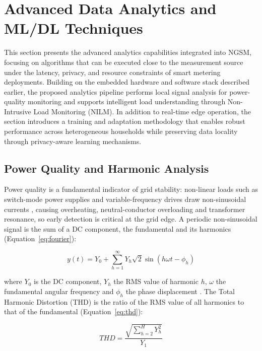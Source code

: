 \documentclass[fleqn,10pt]{wlscirep}
\begin{document}
\section{Advanced Data Analytics and ML/DL Techniques}
\label{sec:ai}

This section presents the advanced analytics capabilities integrated into NGSM, focusing on algorithms that can be executed close to the measurement source under the latency, privacy, and resource constraints of smart metering deployments. Building on the embedded hardware and software stack described earlier, the proposed analytics pipeline performs local signal analysis for power-quality monitoring and supports intelligent load understanding through Non-Intrusive Load Monitoring (NILM). In addition to real-time edge operation, the section introduces a training and adaptation methodology that enables robust performance across heterogeneous households while preserving data locality through privacy-aware learning mechanisms.


\subsection{Power Quality and Harmonic Analysis}
\label{subsec:harmonics}

Power quality is a fundamental indicator of grid stability: non-linear loads such as switch-mode power supplies and variable-frequency drives draw non-sinusoidal currents \cite{dugan2012electrical}, causing overheating, neutral-conductor overloading and transformer resonance, so early detection \cite{eristi2022new} is critical at the grid edge. A periodic non-sinusoidal signal is the sum of a DC component, the fundamental and its harmonics (Equation~\ref{eq:fourier}):

\begin{equation}
\label{eq:fourier}
y(t) = Y_0 + \sum_{h=1}^{\infty} Y_h \sqrt{2} \sin(h\omega t - \phi_h)
\end{equation}

where $Y_0$ is the DC component, $Y_h$ the RMS value of harmonic $h$, $\omega$ the fundamental angular frequency and $\phi_h$ the phase displacement \cite{wakileh2001power}. The Total Harmonic Distortion (THD) is the ratio of the RMS value of all harmonics to that of the fundamental (Equation~\ref{eq:thd}):

\begin{equation}
\label{eq:thd}
THD = \frac{\sqrt{\sum_{h=2}^{H} Y_h^2}}{Y_1}
\end{equation}
\end{document}
